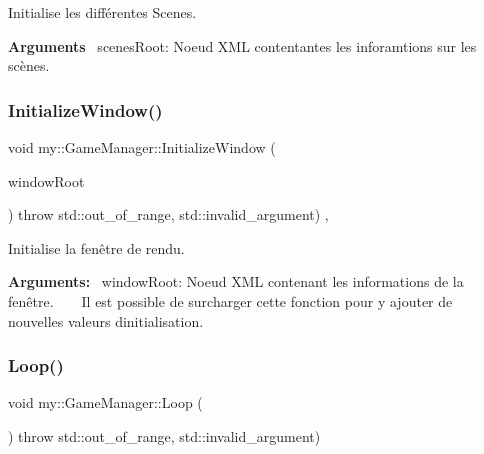 Initialise les différentes Scenes. 

{\bfseries Arguments}~\newline
 scenes\+Root\+: Noeud X\+ML contentantes les inforamtions sur les scènes. ~\newline
~\newline
 \mbox{\label{classmy_1_1GameManager_ab08492747a12e8eed0da29b22b9d84a4}} 
\subsubsection{\texorpdfstring{Initialize\+Window()}{InitializeWindow()}}
{\footnotesize\ttfamily void my\+::\+Game\+Manager\+::\+Initialize\+Window (\begin{DoxyParamCaption}\item[{X\+M\+L\+Node\+::\+X\+M\+L\+Node\+Ptr}]{window\+Root }\end{DoxyParamCaption}) throw  std\+::out\+\_\+of\+\_\+range, std\+::invalid\+\_\+argument) \hspace{0.3cm}{\ttfamily [protected]}, {\ttfamily [virtual]}}



Initialise la fenêtre de rendu. 

{\bfseries Arguments\+:}~\newline
 window\+Root\+: Noeud X\+ML contenant les informations de la fenêtre. ~\newline
~\newline
 Il est possible de surcharger cette fonction pour y ajouter de nouvelles valeurs d\textquotesingle{}initialisation. \mbox{\label{classmy_1_1GameManager_ae4f3327cd31637d91c8089a4b7457739}} 
\subsubsection{\texorpdfstring{Loop()}{Loop()}}
{\footnotesize\ttfamily void my\+::\+Game\+Manager\+::\+Loop (\begin{DoxyParamCaption}{ }\end{DoxyParamCaption}) throw  std\+::out\+\_\+of\+\_\+range, std\+::invalid\+\_\+argument) }



